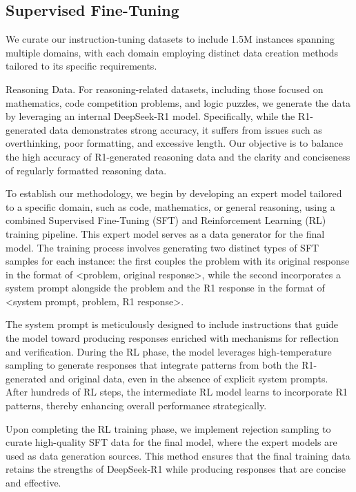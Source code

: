 \documentclass[11pt,a4paper]{article}
\begin{document}
\subsection{Supervised Fine-Tuning}

We curate our instruction-tuning datasets to include 1.5M instances spanning multiple domains, with each domain employing distinct data creation methods tailored to its specific requirements.

Reasoning Data. 
For reasoning-related datasets, including those focused on mathematics, code competition problems, and logic puzzles, we generate the data by leveraging an internal DeepSeek-R1 model. 
Specifically, while the R1-generated data demonstrates strong accuracy, it suffers from issues such as overthinking, poor formatting, and excessive length. 
Our objective is to balance the high accuracy of R1-generated reasoning data and the clarity and conciseness of regularly formatted reasoning data.

To establish our methodology, we begin by developing an expert model tailored to a specific domain, such as code, mathematics, or general reasoning, using a combined Supervised Fine-Tuning (SFT) and Reinforcement Learning (RL) training pipeline. 
This expert model serves as a data generator for the final model. 
The training process involves generating two distinct types of SFT samples for each instance: the first couples the problem with its original response in the format of <problem, original response>, while the second incorporates a system prompt alongside the problem and the R1 response in the format of <system prompt, problem, R1 response>.

The system prompt is meticulously designed to include instructions that guide the model toward producing responses enriched with mechanisms for reflection and verification. 
During the RL phase, the model leverages high-temperature sampling to generate responses that integrate patterns from both the R1-generated and original data, even in the absence of explicit system prompts. 
After hundreds of RL steps, the intermediate RL model learns to incorporate R1 patterns, thereby enhancing overall performance strategically.

Upon completing the RL training phase, we implement rejection sampling to curate high-quality SFT data for the final model, where the expert models are used as data generation sources. 
This method ensures that the final training data retains the strengths of DeepSeek-R1 while producing responses that are concise and effective.
\end{document}
